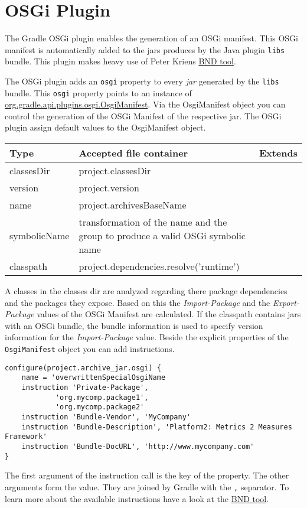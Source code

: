 \chapter{OSGi Plugin} %
\label{cha:osgi_plugin}
The Gradle OSGi plugin enables the generation of an OSGi manifest. This OSGi manifest is automatically added to the jars produces by the Java plugin \texttt{libs} bundle. This plugin makes heavy use of Peter Kriens \href{http://www.aqute.biz/Code/Bnd}{BND tool}. 

The OSGi plugin adds an \texttt{osgi} property to every \emph{jar} generated by the \texttt{libs} bundle. This \texttt{osgi} property points to an instance of \href{\API plugins.osgi/OsgiManifest.html}{org.gradle.api.plugins.osgi.OsgiManifest}. Via the OsgiManifest object you can control the generation of the OSGi Manifest of the respective jar. The OSGi plugin assign default values to the OsgiManifest object. 
\begin{center}
	\begin{tabular}{|l|l|l|} \hline
		Type & Accepted file container & Extends \\ \hline
		classesDir & project.classesDir \\ \hline
		version & project.version \\ \hline
		name & project.archivesBaseName \\ \hline
		symbolicName & transformation of the name and the group to produce a valid OSGi symbolic name \\ \hline		
		classpath & project.dependencies.resolve('runtime') \\ \hline		
	\end{tabular}
\end{center}
A classes in the classes dir are analyzed regarding there package dependencies and the packages they expose. Based on this the \emph{Import-Package} and the \emph{Export-Package} values of the OSGi Manifest are calculated. If the classpath contains jars with an OSGi bundle, the bundle information is used to specify version information for the \emph{Import-Package} value. Beside the explicit properties of the \texttt{OsgiManifest} object you can add instructions. 
\begin{Verbatim}
configure(project.archive_jar.osgi) {
    name = 'overwrittenSpecialOsgiName
    instruction 'Private-Package',
            'org.mycomp.package1',
            'org.mycomp.package2'
    instruction 'Bundle-Vendor', 'MyCompany'
    instruction 'Bundle-Description', 'Platform2: Metrics 2 Measures Framework'
    instruction 'Bundle-DocURL', 'http://www.mycompany.com'
}
\end{Verbatim}
The first argument of the instruction call is the key of the property. The other arguments form the value. They are joined by Gradle with the \texttt{,} separator. To learn more about the available instructions have a look at the \href{http://www.aqute.biz/Code/Bnd}{BND tool}.
